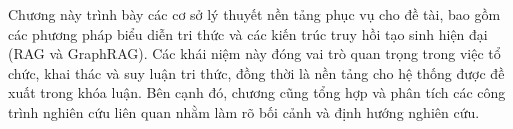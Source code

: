 
Chương này trình bày các cơ sở lý thuyết nền tảng phục vụ cho đề tài, bao gồm các phương pháp biểu diễn tri thức và các kiến trúc truy hồi tạo sinh hiện đại (RAG và GraphRAG). Các khái niệm này đóng vai trò quan trọng trong việc tổ chức, khai thác và suy luận tri thức, đồng thời là nền tảng cho hệ thống được đề xuất trong khóa luận. Bên cạnh đó, chương cũng tổng hợp và phân tích các công trình nghiên cứu liên quan nhằm làm rõ bối cảnh và định hướng nghiên cứu.
